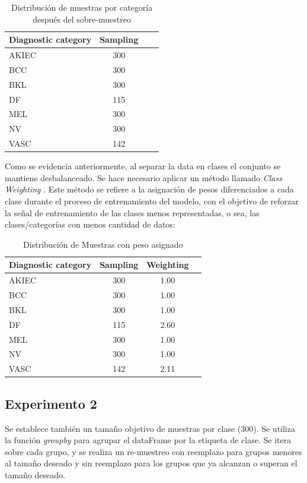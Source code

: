 \begin{table}[ht]
   \centering
   \begin{tabular}{lccc}
   \hline
   Diagnostic category & Sampling  \\ \hline
   AKIEC & 300 \\
   BCC & 300 \\
   BKL & 300 \\
   DF & 115 \\
   MEL & 300 \\
   NV & 300 \\
   VASC & 142 \\ \hline
   \end{tabular}
   \caption{Distribución de muestras por categoría después del sobre-muestreo}
   \label{tab:sampling_distribution}
   \end{table}


Como se evidencia anteriormente, al separar la data en clases el conjunto se mantiene desbalanceado. Se hace necesario aplicar un método llamado \textit{Class Weighting} . Este método se refiere a la asignación de pesos diferenciados a cada clase durante el proceso de entrenamiento del modelo, con el objetivo de reforzar la señal de entrenamiento de las clases menos representadas, o sea, las clases/categorías con menos cantidad de datos:

\begin{table}[ht]
   \centering
   \begin{tabular}{lccc}
   \hline
   Diagnostic category & Sampling  & Weighting\\ \hline
   AKIEC & 300 & 1.00\\
   BCC & 300 & 1.00\\
   BKL & 300 & 1.00\\
   DF & 115 & 2.60\\
   MEL & 300 & 1.00\\
   NV & 300 & 1.00\\
   VASC & 142 & 2.11\\ \hline
   \end{tabular}
   \caption{Distribución de Muestras con peso asignado}
   \label{tab:weighting_distribution}
   \end{table}

\subsection{Experimento 2}

Se establece también un tamaño objetivo de muestras por clase ($300$). Se utiliza la función \textit{groupby} para agrupar el dataFrame por la etiqueta de clase. Se itera sobre cada grupo, y se realiza un re-muestreo con reemplazo para grupos menores al tamaño deseado y sin reemplazo para los grupos que ya alcanzan o superan el tamaño deseado.

